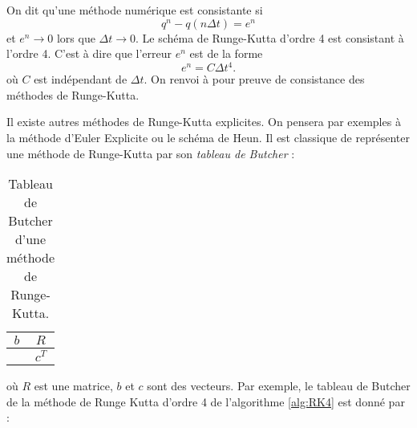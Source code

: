 On dit qu'une méthode numérique est consistante si
\begin{equation}
q^n - q(n \Delta t) = e^n
\end{equation}
et $e^n \rightarrow 0$ lors que $\Delta t \rightarrow 0$. Le schéma de Runge-Kutta d'ordre 4 est consistant à l'ordre 4. C'est à dire que l'erreur $e^n$ est de la forme
\begin{equation}
e^n = C \Delta t^4.
\end{equation}
où $C$ est indépendant de $\Delta t$. On renvoi à \cite{Demailly2016} pour preuve de consistance des méthodes de Runge-Kutta.

Il existe autres méthodes de Runge-Kutta explicites. On pensera par exemples à la méthode d'Euler Explicite ou le schéma de Heun. Il est classique de représenter une méthode de Runge-Kutta par son \textit{tableau de Butcher} :

\begin{table}[htbp]
\begin{center}
\begin{tabular}{c|c}
$b$ & $R$ \\
\hline
    & $c^T$
\end{tabular}
\end{center}
\caption{Tableau de Butcher d'une méthode de Runge-Kutta.}
\label{tab:butcher}
\end{table}

où $R$ est une matrice, $b$ et $c$ sont des vecteurs. Par exemple, le tableau de Butcher de la méthode de Runge Kutta d'ordre 4 de l'algorithme \ref{alg:RK4} est donné par :

